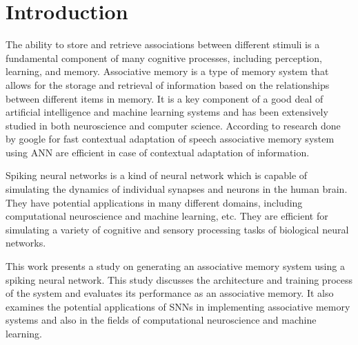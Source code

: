\chapter{Introduction}%

The ability to store and retrieve associations between different stimuli is a
fundamental component of many cognitive processes, including perception,
learning, and memory. Associative memory is a type of memory system that allows
for the storage and retrieval of information based on the relationships between
different items in memory. It is a key component of a good deal of artificial
intelligence and machine learning systems and has been extensively studied in
both neuroscience and computer science. According to research done by google
for fast contextual adaptation of speech\cite{google} associative memory system
using ANN are efficient in case of contextual adaptation of information.

Spiking neural networks is a kind of neural network which is capable of
simulating the dynamics of individual synapses and neurons in the human brain.
They have potential applications in many different domains, including
computational neuroscience and machine learning, etc. They are efficient for
simulating a variety of cognitive and sensory processing tasks of biological
neural networks.

This work presents a study on generating an associative memory system using a
spiking neural network. This study discusses the architecture and training
process of the system and evaluates its performance as an associative memory.
It also examines the potential applications of SNNs in implementing associative
memory systems and also in the fields of computational neuroscience and machine
learning.

\thispagestyle{plain}